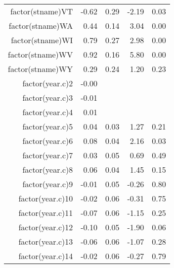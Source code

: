 \begin{table}[ht]
\begin{tabular}{rrrrr}
  factor(stname)VT & -0.62 & 0.29 & -2.19 & 0.03 \\ 
  factor(stname)WA & 0.44 & 0.14 & 3.04 & 0.00 \\ 
  factor(stname)WI & 0.79 & 0.27 & 2.98 & 0.00 \\ 
  factor(stname)WV & 0.92 & 0.16 & 5.80 & 0.00 \\ 
  factor(stname)WY & 0.29 & 0.24 & 1.20 & 0.23 \\ 
  factor(year.c)2 & -0.00 &  &  &  \\ 
  factor(year.c)3 & -0.01 &  &  &  \\ 
  factor(year.c)4 & 0.01 &  &  &  \\ 
  factor(year.c)5 & 0.04 & 0.03 & 1.27 & 0.21 \\ 
  factor(year.c)6 & 0.08 & 0.04 & 2.16 & 0.03 \\ 
  factor(year.c)7 & 0.03 & 0.05 & 0.69 & 0.49 \\ 
  factor(year.c)8 & 0.06 & 0.04 & 1.45 & 0.15 \\ 
  factor(year.c)9 & -0.01 & 0.05 & -0.26 & 0.80 \\ 
  factor(year.c)10 & -0.02 & 0.06 & -0.31 & 0.75 \\ 
  factor(year.c)11 & -0.07 & 0.06 & -1.15 & 0.25 \\ 
  factor(year.c)12 & -0.10 & 0.05 & -1.90 & 0.06 \\ 
  factor(year.c)13 & -0.06 & 0.06 & -1.07 & 0.28 \\ 
  factor(year.c)14 & -0.02 & 0.06 & -0.27 & 0.79 \\ 
   \hline
\end{tabular}
\end{table}
